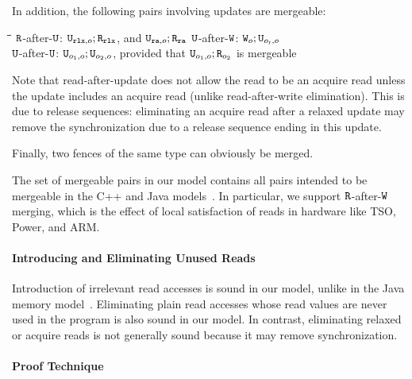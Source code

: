 In addition, the following pairs involving updates are mergeable:
\begin{tabbing}
\hspace{1.5cm}\=\hspace{4.4cm}\=\hspace{1.5cm}\=\hspace{1.5cm}\kill
 $\texttt{R}$-after-$\texttt{U}$: \> $\texttt{U}_{\texttt{rlx}, o}; \texttt{R}_{\texttt{rlx}}$, and $\texttt{U}_{\texttt{ra}, o}; \texttt{R}_{\texttt{ra}}$ \> %
  $\texttt{U}$-after-$\texttt{W}$: \>   $\texttt{W}_o; \texttt{U}_{o_{\text{r}}, o}$ \\[1mm] %
 $\texttt{U}$-after-$\texttt{U}$: \>   $\texttt{U}_{o_1, o}; \texttt{U}_{o_2, o}$, provided that $\texttt{U}_{o_1, o}; \texttt{R}_{o_2}$ is mergeable 
\end{tabbing} 
Note that read-after-update does not allow the read to be an acquire read unless the update includes an acquire read
(unlike read-after-write elimination). This is due to release sequences:
 eliminating an acquire read after a relaxed update may remove the synchronization 
due to a release sequence ending in this update.
 
Finally, two fences of the same type can obviously be merged.

The set of mergeable pairs in our model contains all pairs intended to be mergeable in the C++ and Java models~\cite{c11comp,sevcik:jmm}.
In particular, we support $\texttt{R}$-after-$\texttt{W}$ merging, which is the effect of local satisfaction of reads
in hardware like TSO, Power, and ARM.

\paragraph{Introducing and Eliminating Unused Reads}
Introduction of irrelevant read accesses is sound in our model, unlike in the Java memory model~\cite{sevcik:jmm}.
Eliminating plain read accesses whose read values are never used in the program is also sound in our model.
In contrast, eliminating relaxed or acquire reads is not generally sound because it may remove synchronization.


\paragraph{Proof Technique}

